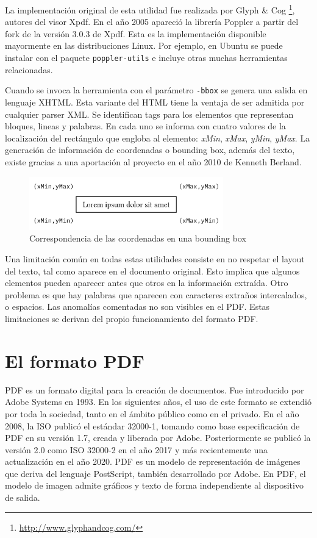 La implementación original de esta utilidad fue realizada por Glyph \& Cog \footnote{\url{http://www.glyphandcog.com/}}, autores del visor Xpdf. En el año 2005 apareció la librería Poppler a partir del fork de la versión 3.0.3 de Xpdf. Esta es la implementación disponible mayormente en las distribuciones Linux. Por ejemplo, en Ubuntu se puede instalar con el paquete \verb|poppler-utils| e incluye otras muchas herramientas relacionadas.

Cuando se invoca la herramienta con el parámetro \verb|-bbox| se genera una salida en lenguaje XHTML. Esta variante del HTML tiene la ventaja de ser admitida por cualquier parser XML. Se identifican tags para los elementos que representan bloques, lineas y palabras. En cada uno se informa con cuatro valores de la localización del rectángulo que engloba al elemento: \emph{xMin}, \emph{xMax}, \emph{yMin}, \emph{yMax}. La generación de información de coordenadas o bounding box, además del texto, existe gracias a una aportación al proyecto en el año 2010 de Kenneth Berland. 

\begin{figure}[hp!]
    \centering
    \includegraphics[width=0.75\textwidth]{imaxes/c-bases-teoricas/correspondencia-coordenadas-bounding.png}
    \caption{Correspondencia de las coordenadas en una bounding box}
    \label{fig:bounding-box}
\end{figure}

Una limitación común en todas estas utilidades consiste en no respetar el layout del texto, tal como aparece en el documento original. Esto implica que algunos elementos pueden aparecer antes que otros en la información extraída. Otro problema es que hay palabras que aparecen con caracteres extraños intercalados, o espacios. Las anomalías comentadas no son visibles en el PDF. Estas limitaciones se derivan del propio funcionamiento del formato PDF.

\section{El formato PDF}

PDF es un formato digital para la creación de documentos. Fue introducido por Adobe Systems en 1993. En los siguientes años, el uso de este formato se extendió por toda la sociedad, tanto en el ámbito público como en el privado. En el año 2008, la ISO publicó el estándar 32000-1, tomando como base especificación de PDF en su versión 1.7, creada y liberada por Adobe. Posteriormente se publicó la versión 2.0 como ISO 32000-2 en el año 2017 y más recientemente una actualización en el año 2020. PDF es un modelo de representación de imágenes que deriva del lenguaje PostScript, también desarrollado por Adobe. En PDF, el modelo de imagen admite gráficos y texto de forma independiente al dispositivo de salida. 

